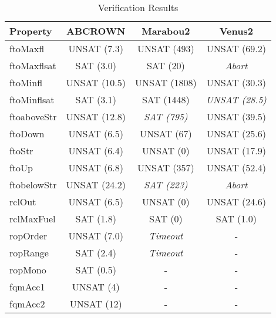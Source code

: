 \begin{table} [htb]
	\centering
  	\caption{Verification Results} \label{tab:results}
	\begin{tabular}{|l | c| c| c|}
		\hline
		Property & ABCROWN  & Marabou2  & Venus2 \\
		\hline
		ftoMaxfl 		& UNSAT (7.3)  	& UNSAT (493) 	& UNSAT (69.2)   \\
		\hline
		ftoMaxflsat 	& SAT (3.0) 		& SAT (20) 		& \emph{Abort} \\
		\hline
		ftoMinfl 		& UNSAT (10.5) 	& UNSAT (1808) 	& UNSAT (30.3)  \\
		\hline
		ftoMinflsat 	& SAT (3.1) 		& SAT (1448) 		& \emph{UNSAT (28.5)} \\
		\hline
		ftoaboveStr 	& UNSAT (12.8) 	&\emph{SAT (795)}		& UNSAT (39.5)\\
		\hline
		ftoDown 		& UNSAT (6.5) 	& UNSAT (67) 		& UNSAT (25.6) \\
		\hline
		ftoStr 	& UNSAT (6.4) 	& UNSAT (0) 		& UNSAT (17.9) \\
		\hline
		ftoUp 			& UNSAT (6.8) 	& UNSAT (357) 	& UNSAT (52.4)  \\
		\hline
		ftobelowStr 	& UNSAT (24.2) 	& \emph{SAT (223)} 		&\emph{Abort} \\
		\hline
		rclOut 	& UNSAT (6.5) 	& UNSAT (0) 		& UNSAT (24.6) \\
		\hline
		rclMaxFuel 	& SAT (1.8) 		& SAT (0) 		& SAT (1.0) \\
		\hline
		ropOrder 		& UNSAT (7.0) 	& \emph{Timeout} 			& - \\
		\hline
		ropRange 		& SAT (2.4) 		& \emph{Timeout} 			& - \\
		\hline
		ropMono 		& SAT (0.5) 		& - 						& - \\
		\hline
		fqmAcc1 		& UNSAT (4) 		& - 						& - \\
		\hline
		fqmAcc2 		& UNSAT (12) 		& - 						& - \\
		\hline
	\end{tabular}


\end{table}

